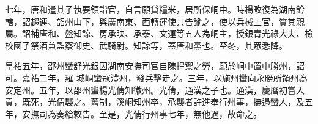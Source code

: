 \begin{pinyinscope}
 七年，唐和遣其子執要領詣官，自言願貸糧米，居所保峒中。時楊畋復為湖南鈐轄，詔趨連、韶州山下，與廣南東、西轉運使共告諭之，使以兵械上官，質其親屬。詔補唐和、盤知諒、房承映、承泰、文運等五人為峒主，授銀青光祿大夫、檢校國子祭酒兼監察御史、武騎尉。知諒等，蓋唐和黨也。至冬，其眾悉降。



 皇祐五年，邵州蠻舒光銀因湖南安撫司官自陳捍禦之勞，願於峒中置中勝州，詔可。嘉祐二年，羅
 城峒蠻寇澧州，發兵擊走之。三年，以施州蠻向永勝所領州為安定州。五年，以邵州蠻楊光倩知徽州。光倩，通漢之子也。通漢，慶曆初嘗入貢，既死，光倩襲之。舊制，溪峒知州卒，承襲者許進奉行州事，撫遏蠻人，及五年，安撫司為奏給敕告。至是，光倩行州事七年，無他過，故命之。



\end{pinyinscope}